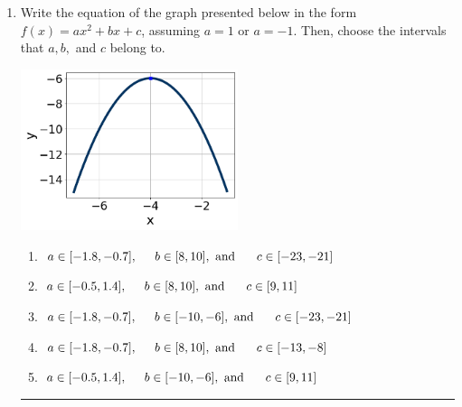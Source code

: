 \documentclass[14pt]{extbook}
\newcommand{\litem}[1]{\item#1\hspace*{-1cm}\rule{\textwidth}{0.4pt}}
\begin{document}
\begin{enumerate}
{\begin{enumerate}[label=\Alph*.]
\end{enumerate} }
\litem{
Write the equation of the graph presented below in the form $f(x)=ax^2+bx+c$, assuming  $a=1$ or $a=-1$. Then, choose the intervals that $a, b,$ and $c$ belong to.
\begin{center}
    \includegraphics[width=0.5\textwidth]{../Figures/quadraticGraphToEquationC.png}
\end{center}
\begin{enumerate}[label=\Alph*.]
\item \( a \in [-1.8, -0.7], \hspace*{5mm} b \in [8, 10], \text{ and } \hspace*{5mm} c \in [-23, -21] \)
\item \( a \in [-0.5, 1.4], \hspace*{5mm} b \in [8, 10], \text{ and } \hspace*{5mm} c \in [9, 11] \)
\item \( a \in [-1.8, -0.7], \hspace*{5mm} b \in [-10, -6], \text{ and } \hspace*{5mm} c \in [-23, -21] \)
\item \( a \in [-1.8, -0.7], \hspace*{5mm} b \in [8, 10], \text{ and } \hspace*{5mm} c \in [-13, -8] \)
\item \( a \in [-0.5, 1.4], \hspace*{5mm} b \in [-10, -6], \text{ and } \hspace*{5mm} c \in [9, 11] \)


\end{enumerate}}
\end{enumerate}
\end{document}
